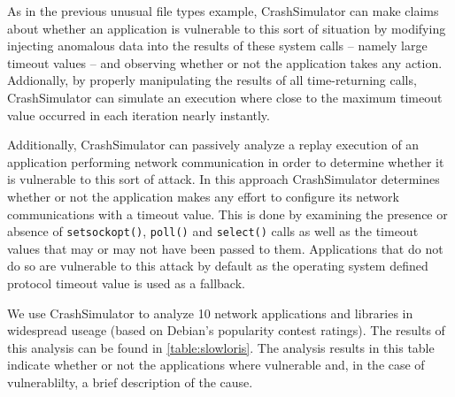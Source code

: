 As in the previous unusual file types example, CrashSimulator can make claims
about whether an application is vulnerable to this sort of situation by
modifying injecting anomalous data into the results of these system calls --
namely large timeout values -- and observing whether or not the application
takes any action.  Addionally, by properly manipulating the results of all
time-returning calls, CrashSimulator can simulate an execution where close to
the maximum timeout value occurred in each iteration nearly instantly.

Additionally, CrashSimulator can passively analyze a replay execution of an
application performing network communication in order to determine whether it is
vulnerable to this sort of attack.  In this approach CrashSimulator determines
whether or not the application makes any effort to configure its network
communications with a timeout value. This is done by examining the presence or
absence of {\tt setsockopt()}, {\tt poll()} and {\tt select()} calls as well as
the timeout values that may or may not have been passed to them. Applications
that do not do so are vulnerable to this attack by default as the operating
system defined protocol timeout value is used as a fallback.

We use CrashSimulator to analyze 10 network applications and libraries in
widespread useage (based on Debian's popularity contest ratings).  The results
of this analysis can be found in \ref{table:slowloris}.  The analysis results in
this table indicate whether or not the applications where vulnerable and, in the
case of vulnerablilty, a brief description of the cause.

